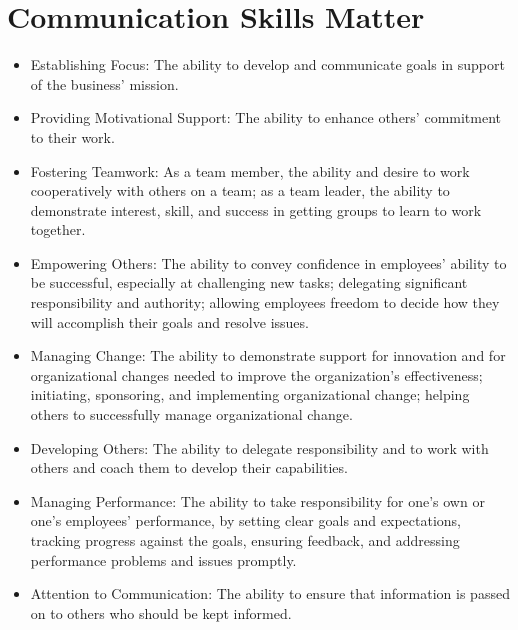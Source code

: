 \documentclass[12pt]{article}
\begin{document}
\section{Communication Skills Matter}
\begin{itemize}
\item Establishing Focus: The ability to develop and communicate goals in support of the business’ mission.
\item Providing Motivational Support: The ability to enhance others’ commitment to their work.
\item Fostering Teamwork: As a team member, the ability and desire to work cooperatively with others on a team; as a team leader, the ability to demonstrate interest, skill, and success in getting groups to learn to work together.
\item Empowering Others: The ability to convey confidence in employees’ ability to be successful, especially at challenging new tasks; delegating significant responsibility and authority; allowing employees freedom to decide how they will accomplish their goals and resolve issues.
\item Managing Change: The ability to demonstrate support for innovation and for organizational changes needed to improve the organization’s effectiveness; initiating, sponsoring, and implementing organizational change; helping others to successfully manage organizational change.
\item Developing Others: The ability to delegate responsibility and to work with others and coach them to develop their capabilities.
\item Managing Performance: The ability to take responsibility for one’s own or one’s employees’ performance, by setting clear goals and expectations, tracking progress against the goals, ensuring feedback, and addressing performance problems and issues promptly.
\item Attention to Communication: The ability to ensure that information is passed on to others who should be kept informed.
\end{itemize}
\end{document}
